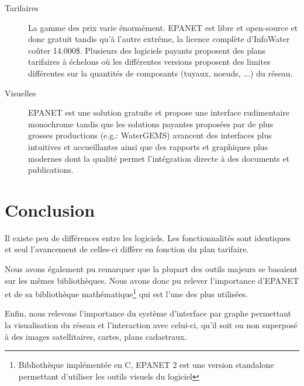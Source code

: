 \documentclass[a4paper, 11pt]{article}
\begin{document}
\begin{description}
    \item[Tarifaires] La gamme des prix varie énormément. EPANET est libre et open-source et donc gratuit tandis qu'à l'autre extrême, la licence complète d'InfoWater coûter 14.000\$. Plusieurs des logiciels payants proposent des plans tarifaires à échelons où les différentes versions proposent des limites différentes sur la quantités de composants (tuyaux, noeuds, ...) du réseau.
    \item[Visuelles] EPANET est une solution gratuite et propose une interface rudimentaire monochrome tandis que les solutions payantes proposées par de plus grosses productions (e.g.: WaterGEMS) avancent des interfaces plus intuitives et accueillantes ainsi que des rapports et graphiques plus modernes dont la qualité permet l'intégration directe à des documents et publications.
\end{description}

\section*{Conclusion}
Il existe peu de différences entre les logiciels. Les fonctionnalités sont identiques et seul l'avancement de celles-ci diffère en fonction du plan tarifaire.

Nous avons également pu remarquer que la plupart des outils majeurs se basaient sur les mêmes bibliothèques. Nous avons donc pu relever l'importance d'EPANET et de sa bibliothèque mathématique\footnote{Bibliothèque implémentée en C, EPANET 2 est une version standalone permettant d'utiliser les outils visuels du logiciel} qui est l'une des plus utilisées.

Enfin, nous relevons l'importance du système d'interface par graphe permettant la visualisation du réseau et l'interaction avec celui-ci, qu'il soit ou non superposé à des images satellitaires, cartes, plans cadastraux.
\end{document}
